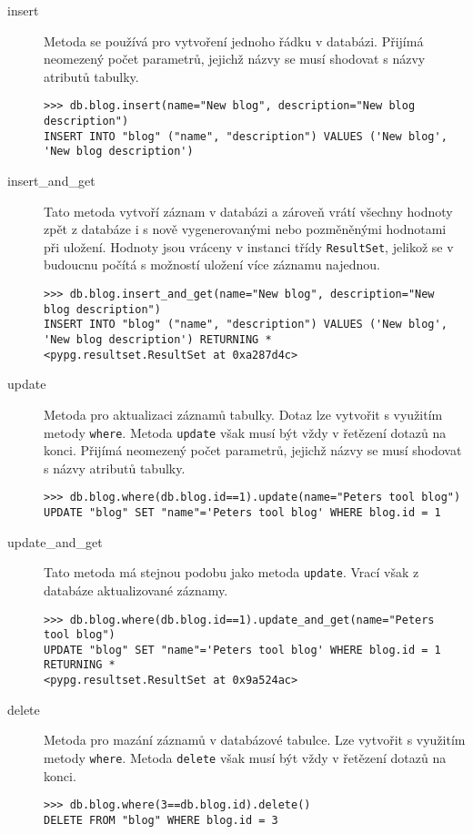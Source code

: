 \documentclass[11pt]{article}
\begin{document}
\begin{description}
\item[insert] Metoda se používá pro vytvoření jednoho řádku v databázi. Přijímá neomezený počet parametrů, jejichž názvy se musí shodovat s názvy atributů tabulky.
\begin{lstlisting}[style=python]
>>> db.blog.insert(name="New blog", description="New blog description")
INSERT INTO "blog" ("name", "description") VALUES ('New blog', 'New blog description')
\end{lstlisting}
\item[insert\_and\_get] Tato metoda vytvoří záznam v databázi a zároveň vrátí všechny hodnoty zpět z databáze i s nově vygenerovanými nebo pozměněnými hodnotami při uložení. Hodnoty jsou vráceny v instanci třídy \lstinline[style=inline]|ResultSet|, jelikož se v budoucnu počítá s možností uložení více záznamu najednou.
\begin{lstlisting}[style=python]
>>> db.blog.insert_and_get(name="New blog", description="New blog description")
INSERT INTO "blog" ("name", "description") VALUES ('New blog', 'New blog description') RETURNING *
<pypg.resultset.ResultSet at 0xa287d4c>
\end{lstlisting}
\item[update] Metoda pro aktualizaci záznamů tabulky. Dotaz lze vytvořit s využitím metody \lstinline[style=inline]|where|. Metoda \lstinline[style=inline]|update| však musí být vždy v řetězení dotazů na konci. Přijímá neomezený počet parametrů, jejichž názvy se musí shodovat s názvy atributů tabulky.
\begin{lstlisting}[style=python]
>>> db.blog.where(db.blog.id==1).update(name="Peters tool blog")
UPDATE "blog" SET "name"='Peters tool blog' WHERE blog.id = 1
\end{lstlisting}
\item[update\_and\_get] Tato metoda má stejnou podobu jako metoda \lstinline[style=inline]|update|. Vrací však z databáze aktualizované záznamy. 
\begin{lstlisting}[style=python]
>>> db.blog.where(db.blog.id==1).update_and_get(name="Peters tool blog")
UPDATE "blog" SET "name"='Peters tool blog' WHERE blog.id = 1 RETURNING *
<pypg.resultset.ResultSet at 0x9a524ac>
\end{lstlisting}
\item[delete] Metoda pro mazání záznamů v databázové tabulce. Lze vytvořit s využitím metody \lstinline[style=inline]|where|. Metoda \lstinline[style=inline]|delete| však musí být vždy v řetězení dotazů na konci.
\begin{lstlisting}[style=python]
>>> db.blog.where(3==db.blog.id).delete()
DELETE FROM "blog" WHERE blog.id = 3
\end{lstlisting}
\end{description}
\end{document}
